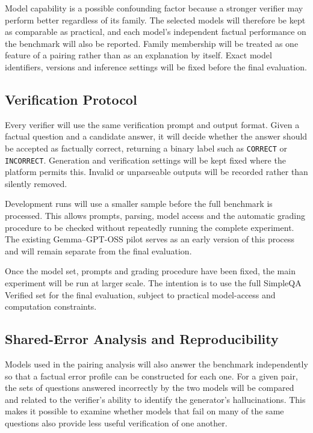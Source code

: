 \documentclass[11pt,a4paper]{article}
\begin{document}
	Model capability is a possible confounding factor because a stronger verifier may perform better regardless of its family. The selected models will therefore be kept as comparable as practical, and each model's independent factual performance on the benchmark will also be reported. Family membership will be treated as one feature of a pairing rather than as an explanation by itself. Exact model identifiers, versions and inference settings will be fixed before the final evaluation.
	
	\subsection{Verification Protocol}
	
	Every verifier will use the same verification prompt and output format. Given a factual question and a candidate answer, it will decide whether the answer should be accepted as factually correct, returning a binary label such as \texttt{CORRECT} or \texttt{INCORRECT}. Generation and verification settings will be kept fixed where the platform permits this. Invalid or unparseable outputs will be recorded rather than silently removed.
	
	Development runs will use a smaller sample before the full benchmark is processed. This allows prompts, parsing, model access and the automatic grading procedure to be checked without repeatedly running the complete experiment. The existing Gemma--GPT-OSS pilot serves as an early version of this process and will remain separate from the final evaluation.
	
	Once the model set, prompts and grading procedure have been fixed, the main experiment will be run at larger scale. The intention is to use the full SimpleQA Verified set for the final evaluation, subject to practical model-access and computation constraints.
	
	\subsection{Shared-Error Analysis and Reproducibility}
	
	Models used in the pairing analysis will also answer the benchmark independently so that a factual error profile can be constructed for each one. For a given pair, the sets of questions answered incorrectly by the two models will be compared and related to the verifier's ability to identify the generator's hallucinations. This makes it possible to examine whether models that fail on many of the same questions also provide less useful verification of one another.
	
\end{document}
